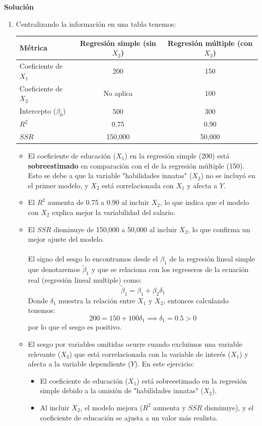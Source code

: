 \documentclass[10pt,a4paper]{article}
\begin{document}
\textbf{Solución}

\begin{enumerate}
    \item Centralizando la información en una tabla tenemos:
    \begin{center}
\begin{tabular}{|l|c|c|}
\hline
Métrica & Regresión simple (sin \( X_2 \)) & Regresión múltiple (con \( X_2 \)) \\
\hline
Coeficiente de \( X_1 \) & 200 & 150 \\
Coeficiente de \( X_2 \) & No aplica & 100 \\
Intercepto (\( \beta_0 \)) & 500 & 300 \\
\( R^2 \) & 0.75 & 0.90 \\
\( SSR \) & 150,000 & 50,000 \\
\hline
\end{tabular}
\end{center}
\begin{itemize}
    \item El coeficiente de educación (\( X_1 \)) en la regresión simple (200) está \textbf{sobreestimado} en comparación con el de la regresión múltiple (150). Esto se debe a que la variable "habilidades innatas" (\( X_2 \)) no se incluyó en el primer modelo, y \( X_2 \) está correlacionada con \( X_1 \) y afecta a \( Y \).
    \item El \( R^2 \) aumenta de 0.75 a 0.90 al incluir \( X_2 \), lo que indica que el modelo con \( X_2 \) explica mejor la variabilidad del salario.
    \item El \( SSR \) disminuye de 150,000 a 50,000 al incluir \( X_2 \), lo que confirma un mejor ajuste del modelo.\\
    \\
    El signo del sesgo lo encontramos desde el $\beta_1$ de la regresión lineal simple que denotaremos $\tilde{\beta}_1$ y que se relaciona con los regreseros de la ecuación real (regresión lineal multiple) como:
    $$\tilde{\beta}_1 = \beta_1 + \beta_2 \delta_1$$
    Donde $\delta_1$ muestra la relación entre $X_1$ y $X_2$, entonces calculando tenemos:
    $$200 = 150 + 100\delta_1 \implies \delta_1 = 0.5 >0$$
    por lo que el sesgo es positivo.

    \item El sesgo por variables omitidas ocurre cuando excluimos una variable relevante (\( X_2 \)) que está correlacionada con la variable de interés (\( X_1 \)) y afecta a la variable dependiente (\( Y \)). En este ejercicio:
\begin{itemize}
    \item El coeficiente de educación (\( X_1 \)) está sobreestimado en la regresión simple debido a la omisión de "habilidades innatas" (\( X_2 \)).
    \item Al incluir \( X_2 \), el modelo mejora (\( R^2 \) aumenta y \( SSR \) disminuye), y el coeficiente de educación se ajusta a un valor más realista.
\end{itemize}
    
\end{itemize}


    
\end{enumerate}
\end{document}
